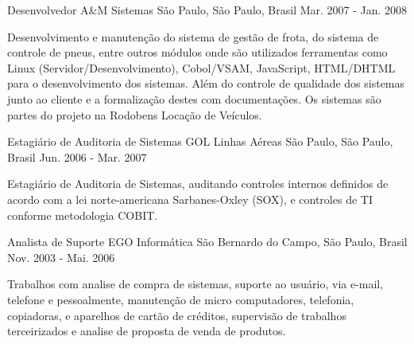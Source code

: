 \begin{cventries}
  \cventry
    {Desenvolvedor} %
    {A\&M Sistemas} %
    {São Paulo, São Paulo, Brasil} %
    {Mar. 2007 - Jan. 2008} %
    {
      \begin{cvitems} %
        \item {Desenvolvimento e manutenção do sistema de gestão de frota, do sistema de controle de pneus, entre outros módulos onde são utilizados ferramentas como Linux (Servidor/Desenvolvimento), Cobol/VSAM, JavaScript, HTML/DHTML para o desenvolvimento dos sistemas. Além do controle de qualidade dos sistemas junto ao cliente e a formalização destes com documentações. Os sistemas são partes do projeto na Rodobens Locação de Veículos.}
      \end{cvitems}
    }

  \cventry
    {Estagiário de Auditoria de Sistemas} %
    {GOL Linhas Aéreas} %
    {São Paulo, São Paulo, Brasil} %
    {Jun. 2006 - Mar. 2007} %
    {
      \begin{cvitems} %
        \item {Estagiário de Auditoria de Sistemas, auditando controles internos definidos de acordo com a lei norte-americana Sarbanes-Oxley (SOX), e controles de TI conforme metodologia COBIT.}
      \end{cvitems}
    }

  \cventry
    {Analista de Suporte} %
    {EGO Informática} %
    {São Bernardo do Campo, São Paulo, Brasil} %
    {Nov. 2003 - Mai. 2006} %
    {
      \begin{cvitems} %
        \item {Trabalhos com analise de compra de sistemas, suporte ao usuário, via e-mail, telefone e pessoalmente, manutenção de micro computadores, telefonia, copiadoras, e aparelhos de cartão de créditos, supervisão de trabalhos terceirizados e analise de proposta de venda de produtos.}
      \end{cvitems}
    }

\end{cventries}
